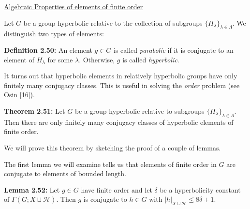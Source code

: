 \documentclass[12pt]{article}
\newcommand{\vs}{\vskip10pt}
\begin{document}
	\vs
	
	\underline{Algebraic Properties of elements of finite order}
	
	\vs 
	
	Let $G$ be a group hyperbolic relative to the collection of subgroups $\{H_{\lambda}\}_{\lambda \in \Lambda}$. We distinguish two types of elements: 
	
	\vs 
	
	\textbf{Definition 2.50: } An element $g \in G$ is called \textit{parabolic} if it is conjugate to an element of $H_{\lambda}$ for some $\lambda$. Otherwise, $g$ is called \textit{hyperbolic}. 
	
	\vs 
	
	It turns out that hyperbolic elements in relatively hyperbolic groups have only finitely many conjugacy classes. This is useful in solving the \textit{order} problem (see Osin [16]). 
	
	\vs 
	
	\textbf{Theorem 2.51: } Let $G$ be a group hyperbolic relative to subgroups $\{H_{\lambda}\}_{\lambda \in \Lambda}$. Then there are only finitely many conjugacy classes of hyperbolic elements of finite order. 
	
	\vs 
	
	We will prove this theorem by sketching the proof of a couple of lemmas. 
	
	\vs 
	
	The first lemma we will examine tells us that elements of finite order in $G$ are conjugate to elements of bounded length. 
	
	\vs 
	
	\textbf{Lemma 2.52: } Let $g \in G$ have finite order and let $\delta$ be a hyperbolicity constant of $\Gamma(G; X \sqcup \mathcal{H})$. Then $g$ is conjugate to $h \in G$ with $\vert h \vert_{X \cup \mathcal{H}} \leq 8 \delta + 1$. 
	
\end{document}
